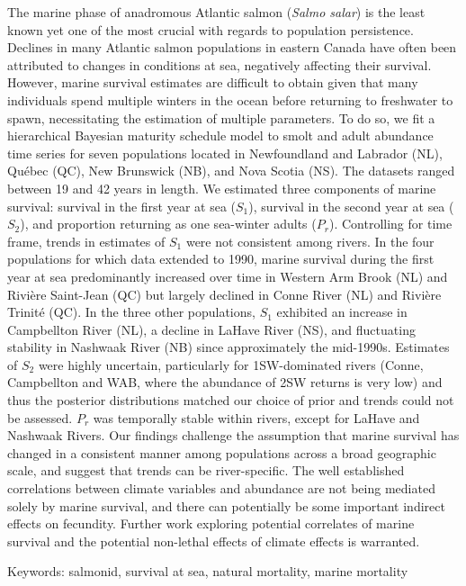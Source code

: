 \documentclass[12pt]{article}
\newcommand{\So}{$S_{1}$\xspace}
\newcommand{\St}{$S_{2}$\xspace}
\newcommand{\Pg}{$P_r$\xspace}
\begin{document}
The marine phase of anadromous Atlantic salmon (\emph{Salmo salar}) is the
least known yet one of the most crucial with regards to population
persistence. Declines in many Atlantic salmon populations in eastern
Canada have often been attributed to changes in conditions at sea, negatively
affecting their survival. However, marine survival estimates are difficult to
obtain given that many individuals spend multiple winters in the ocean before
returning to freshwater to spawn, necessitating the estimation of multiple
parameters. To do so, we fit a hierarchical Bayesian maturity schedule model
to smolt and adult abundance time series for seven populations located in
Newfoundland and Labrador (NL), Qu\'{e}bec (QC), New Brunswick (NB), and Nova
Scotia (NS). The datasets ranged between 19 and 42 years in length. We
estimated three components of marine survival: survival in the first year at
sea (\So), survival in the second year at sea (\St), and proportion returning
as one sea-winter adults (\Pg). Controlling for time frame, trends in
estimates of \So were not consistent among rivers.
In the four populations for which data extended to 1990, marine survival
during the first year at sea predominantly increased over time in Western Arm
Brook (NL) and Rivi\`{e}re Saint-Jean (QC) but largely declined in Conne River
(NL) and Rivi\`{e}re Trinit\'{e} (QC). In the three other populations, \So
exhibited an increase in Campbellton River (NL), a decline in LaHave River
(NS), and fluctuating stability in Nashwaak River (NB) since approximately the
mid-1990s. 
Estimates of \St were highly uncertain, particularly for 1SW-dominated rivers
(Conne, Campbellton and WAB, where the abundance of 2SW returns is very low)
and thus the posterior distributions matched our choice of prior and trends
could not be assessed. 
\Pg was temporally stable within rivers, except for LaHave and Nashwaak Rivers. 
Our findings challenge the assumption that marine survival has changed in a consistent
manner among populations across a broad geographic scale, and suggest that
trends can be river-specific. 
The well established correlations between climate variables and abundance are
not being mediated solely by marine survival, and there can potentially be
some important indirect effects on fecundity.
Further work exploring potential correlates of marine survival and the
potential non-lethal effects of climate effects is warranted.


Keywords: salmonid, survival at sea, natural mortality, marine mortality

\end{document}
